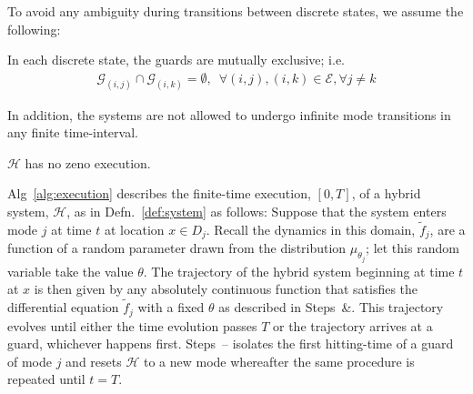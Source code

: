 To avoid any ambiguity during transitions between discrete states, we assume the following:
\begin{assump}
    In each discrete state, the guards are mutually exclusive; i.e.
    \begin{align}
    \mathcal G_{(i,j)}\cap \mathcal G_{(i,k)}=\emptyset,\phantom{8}\forall (i,j),(i,k)\in \mathcal E, \forall j\ne k
    \end{align}
\end{assump}
In addition, the systems are not allowed to undergo infinite mode transitions in any finite time-interval.
\begin{assump}
  $\mathcal H$ has no zeno execution.
  \label{assump:zeno}
\end{assump}
Alg~\ref{alg:execution} describes the finite-time execution, $[0,T]$, of a hybrid system, $\mathcal H$, as in Defn.~\ref{def:system} as follows:
Suppose that the system enters mode $j$ at time $t$ at location $x \in D_j$.
Recall the dynamics in this domain, $\tilde f_j$, are a function of a random parameter drawn from the distribution $\mu_{\theta_j}$; let this random variable take the value $\theta$.
The trajectory of the hybrid system beginning at time $t$ at $x$ is then given by any absolutely continuous function that satisfies the differential equation $\tilde f_j$ with a fixed $\theta$ as described in Steps~\&.
This trajectory evolves until either the time evolution passes $T$ or the trajectory arrives at a guard, whichever happens first.
Steps~-- isolates the first hitting-time of a guard of mode $j$ and resets $\mathcal H$ to a new mode whereafter the same procedure is repeated until $t=T$.


